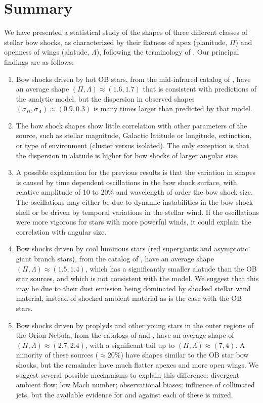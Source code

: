
\section{Summary}
\label{sec:conclusion}

We have presented a statistical study of the shapes of three different
classes of stellar bow shocks, as characterized by their flatness of
apex (planitude, \(\Pi\)) and openness of wings (alatude,
\(\Lambda\)), following the terminology of
\citet[Paper~0]{Tarango-Yong:2018a}.  Our principal findings are as
follows:
\begin{enumerate}[1.]
\item Bow shocks driven by hot OB stars, from the mid-infrared catalog
  of \citet{Kobulnicky:2016a}, have an average shape
  \((\Pi, \Lambda) \approx (1.6, 1.7)\) that is consistent with predictions of the
  \citet{Wilkin:1996a} analytic model, but the dispersion in observed
  shapes \((\sigma_\Pi, \sigma_\Lambda) \approx (0.9, 0.3)\) is many times larger than
  predicted by that model.
\item The bow shock shapes show little correlation with other
  parameters of the source, such as stellar magnitude, Galactic
  latitude or longitude, extinction, or type of environment (cluster
  versus isolated).  The only exception is that the dispersion in
  alatude is higher for bow shocks of larger angular size.
\item A possible explanation for the previous results is that the
  variation in shapes is caused by time dependent oscillations in the
  bow shock surface, with relative amplitude of 10 to 20\% and
  wavelength of order the bow shock size.  The oscillations may either
  be due to dynamic instabilities in the bow shock shell or be driven
  by temporal variations in the stellar wind.  If the oscillations
  were more vigorous for stars with more powerful winds, it could
  explain the correlation with angular size.
\item Bow shocks driven by cool luminous stars (red supergiants and
  asymptotic giant branch stars), from the catalog of
  \citep{Cox:2012a}, have an average shape
  \((\Pi, \Lambda) \approx (1.5, 1.4)\), which has a significantly smaller alatude
  than the OB star sources, and which is not consistent with the
  \citet{Wilkin:1996a} model.  We suggest that this may be due to
  their dust emission being dominated by shocked stellar wind
  material, instead of shocked ambient material as is the case with
  the OB stars.
\item Bow shocks driven by proplyds and other young stars in the outer
  regions of the Orion Nebula, from the catalogs of
  \citet{Bally:2006a} and \citet{Gutierrez-Soto:2015a}, have an
  average shape of \((\Pi, \Lambda) \approx (2.7, 2.4)\), with a significant tail up
  to \((\Pi, \Lambda) \approx (7, 4)\).  A minority of these sources
  (\(\approx 20\%\)) have shapes similar to the OB star bow shocks, but the
  remainder have much flatter apexes and more open wings.  We suggest
  several possible mechanisms to explain this difference: divergent
  ambient flow; low Mach number; observational biases; influence of
  collimated jets, but the available evidence for and against each of
  these is mixed.
\end{enumerate}


